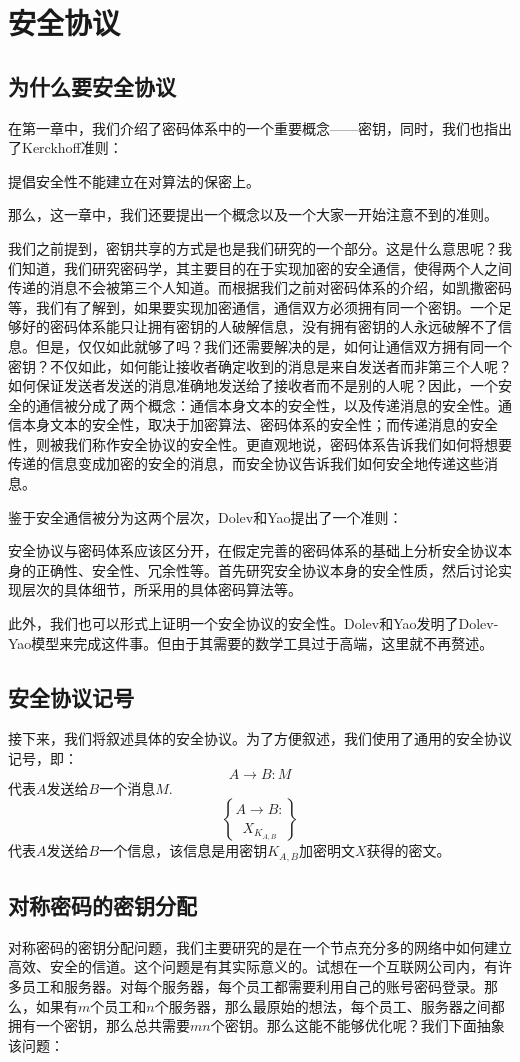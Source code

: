 \chapter{安全协议}
\section{为什么要安全协议}
在第一章中，我们介绍了密码体系中的一个重要概念——密钥，同时，我们也指出了Kerckhoff准则：\par
提倡安全性不能建立在对算法的保密上。\par
那么，这一章中，我们还要提出一个概念以及一个大家一开始注意不到的准则。\par
我们之前提到，密钥共享的方式是也是我们研究的一个部分。这是什么意思呢？我们知道，我们研究密码学，其主要目的在于实现加密的安全通信，使得两个人之间传递的消息不会被第三个人知道。而根据我们之前对密码体系的介绍，如凯撒密码等，我们有了解到，如果要实现加密通信，通信双方必须拥有同一个密钥。一个足够好的密码体系能只让拥有密钥的人破解信息，没有拥有密钥的人永远破解不了信息。但是，仅仅如此就够了吗？我们还需要解决的是，如何让通信双方拥有同一个密钥？不仅如此，如何能让接收者确定收到的消息是来自发送者而非第三个人呢？如何保证发送者发送的消息准确地发送给了接收者而不是别的人呢？因此，一个安全的通信被分成了两个概念：通信本身文本的安全性，以及传递消息的安全性。通信本身文本的安全性，取决于加密算法、密码体系的安全性；而传递消息的安全性，则被我们称作安全协议的安全性。更直观地说，密码体系告诉我们如何将想要传递的信息变成加密的安全的消息，而安全协议告诉我们如何安全地传递这些消息。\par
鉴于安全通信被分为这两个层次，Dolev和Yao提出了一个准则：\par
安全协议与密码体系应该区分开，在假定完善的密码体系的基础上分析安全协议本身的正确性、安全性、冗余性等。首先研究安全协议本身的安全性质，然后讨论实现层次的具体细节，所采用的具体密码算法等。\par
此外，我们也可以形式上证明一个安全协议的安全性。Dolev和Yao发明了Dolev-Yao模型来完成这件事。但由于其需要的数学工具过于高端，这里就不再赘述。
\section{安全协议记号}
接下来，我们将叙述具体的安全协议。为了方便叙述，我们使用了通用的安全协议记号，即：
\[A\to B: M\]
代表$A$发送给$B$一个消息$M$.
\[A\to B: \brace{X}_{K_{A, B}}\]
代表$A$发送给$B$一个信息，该信息是用密钥$K_{A, B}$加密明文$X$获得的密文。
\section{对称密码的密钥分配}
对称密码的密钥分配问题，我们主要研究的是在一个节点充分多的网络中如何建立高效、安全的信道。这个问题是有其实际意义的。试想在一个互联网公司内，有许多员工和服务器。对每个服务器，每个员工都需要利用自己的账号密码登录。那么，如果有$m$个员工和$n$个服务器，那么最原始的想法，每个员工、服务器之间都拥有一个密钥，那么总共需要$mn$个密钥。那么这能不能够优化呢？我们下面抽象该问题：
